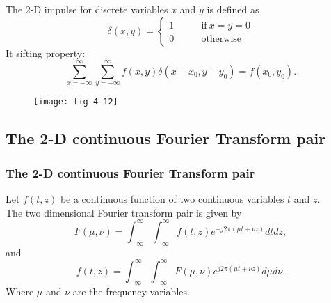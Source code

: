 
\begin{frame}
The 2-D impulse for discrete variables $x$ and $y$ is defined as
\begin{equation}
\delta(x,y) = \left \{
\begin{split}
1 & \qquad \text{if}\ x=y=0\\
0 &  \qquad \text{otherwise}
\end{split}
\right .
\end{equation}
It sifting property:
\begin{equation}
\sum_{x=-\infty}^{\infty} \sum_{y=-\infty}^{\infty} f(x,y)\delta(x - x_{0},y - y_{0}) = f(x_{0},y_{0}).
\end{equation}
\begin{figure}
\centering
\texttt{[image: fig-4-12]}
\end{figure}
\end{frame}


\subsection{The 2-D continuous Fourier Transform pair}


\begin{frame}
\frametitle{The 2-D continuous Fourier Transform pair}
Let $f(t,z)$ be a continuous function of two continuous variables $t$ and $z$.\\
The two dimensional Fourier transform pair is given by
\begin{equation}
F(\mu, \nu) = \int_{-\infty}^{\infty} \int_{-\infty}^{\infty} f(t,z) e^{-j2\pi (\mu t + \nu z)} dtdz,
\end{equation}
and
\begin{equation}
f(t,z) = \int_{-\infty}^{\infty} \int_{-\infty}^{\infty} F(\mu, \nu) e^{j2\pi (\mu t + \nu z	)} d\mu d\nu.
\end{equation}
Where $\mu$ and $\nu$ are the frequency variables.
\end{frame}


